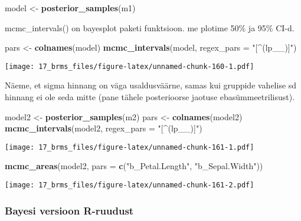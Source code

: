 \documentclass[]{article}
\newenvironment{Shaded}{\begin{snugshade}}{\end{snugshade}}
\newcommand{\KeywordTok}[1]{\textcolor[rgb]{0.13,0.29,0.53}{\textbf{#1}}}
\newcommand{\DataTypeTok}[1]{\textcolor[rgb]{0.13,0.29,0.53}{#1}}
\newcommand{\StringTok}[1]{\textcolor[rgb]{0.31,0.60,0.02}{#1}}
\newcommand{\NormalTok}[1]{#1}
\begin{document}
\begin{Shaded}
\begin{Highlighting}[]
\NormalTok{model <-}\StringTok{ }\KeywordTok{posterior_samples}\NormalTok{(m1)}
\end{Highlighting}
\end{Shaded}

mcmc\_intervals() on bayesplot paketi funktsioon. me plotime 50\% ja
95\% CI-d.

\begin{Shaded}
\begin{Highlighting}[]
\NormalTok{pars <-}\StringTok{ }\KeywordTok{colnames}\NormalTok{(model)}
\KeywordTok{mcmc_intervals}\NormalTok{(model, }\DataTypeTok{regex_pars =} \StringTok{"[^(lp__)]"}\NormalTok{)}
\end{Highlighting}
\end{Shaded}

\texttt{[image: 17\_brms\_files/figure-latex/unnamed-chunk-160-1.pdf]}

Näeme, et sigma hinnang on väga usaldusväärne, samas kui gruppide
vahelise sd hinnang ei ole seda mitte (pane tähele posterioorse jaotuse
ebasümmeetrilisust).

\begin{Shaded}
\begin{Highlighting}[]
\NormalTok{model2 <-}\StringTok{ }\KeywordTok{posterior_samples}\NormalTok{(m2)}
\NormalTok{pars <-}\StringTok{ }\KeywordTok{colnames}\NormalTok{(model2)}
\KeywordTok{mcmc_intervals}\NormalTok{(model2, }\DataTypeTok{regex_pars =} \StringTok{"[^(lp__)]"}\NormalTok{)}
\end{Highlighting}
\end{Shaded}

\texttt{[image: 17\_brms\_files/figure-latex/unnamed-chunk-161-1.pdf]}

\begin{Shaded}
\begin{Highlighting}[]
\KeywordTok{mcmc_areas}\NormalTok{(model2,  }\DataTypeTok{pars =} \KeywordTok{c}\NormalTok{(}\StringTok{"b_Petal.Length"}\NormalTok{, }\StringTok{"b_Sepal.Width"}\NormalTok{))}
\end{Highlighting}
\end{Shaded}

\texttt{[image: 17\_brms\_files/figure-latex/unnamed-chunk-161-2.pdf]}

\subsubsection{Bayesi versioon
R-ruudust}\label{bayesi-versioon-r-ruudust}
\end{document}
